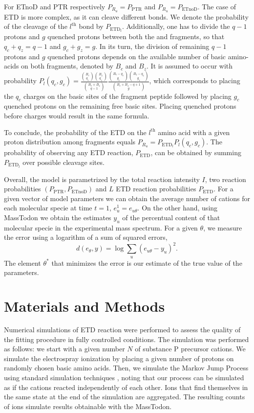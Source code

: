 \documentclass{llncs}
\begin{document}
For ETnoD and PTR respectively $P_{R_u}=P_\text{PTR}$ and $P_{R_u}=P_\text{ETnoD}$.
The case of ETD is more complex, as it can cleave different bonds. We denote the probability of the cleavage of the $l^\text{th}$ bond by $P_{\text{ETD}_l}$. Additionally, one has to divide the $q-1$ protons and $g$ quenched protons between both the  and  fragments, so that $q_c+q_z=q-1$ and $g_c+g_z = g$. In its turn, the division of remaining $q-1$ protons and $g$ quenched protons depends on the available number of basic amino-acids on both fragments, denoted by $B_c$ and $B_z$. It is assumed to occur with probability $P_l(q_c, g_c) = \frac{ \binom{B_c}{q_c}\binom{B_z}{q_z} }{ \binom{B_c+B_z}{q-1} } \frac{ \binom{B_c - q_c}{g_c} \binom{B_z-q_z}{g_z} }{ \binom{B_c+B_z-q+1}{g} }$,
which corresponds to placing the $q_c$ charges on the basic sites of the fragment peptide followed by placing $g_c$ quenched protons on the remaining free basic sites. Placing quenched protons before charges would result in the same formula.

To conclude, the probability of the ETD on the $l^\text{th}$ amino acid with a given proton distribution among fragments equals $P_{R_u}=P_{\text{ETD}_l} P_l(q_c, g_c)$. The probability of observing any ETD reaction, $P_\text{ETD}$, can be obtained by summing $P_{\text{ETD}_l}$ over possible cleavage sites.

Overall, the model is parametrized by the total reaction intensity $I$, two reaction probabilities $(P_\text{PTR}, P_\text{ETnoD})$ and $L$ ETD reaction probabilities $P_\text{ETD}$. For a given vector of model parameters  we can obtain the average number of cations for each molecular specie at time $t=1$, $e_u^1 =e_{u\theta}$. On the other hand, using {\sc MassTodon} we obtain the estimates $y_u$ of the percentual content of that molecular specie in the experimental mass spectrum. For a given $\theta$, we measure the error using a logarithm of a sum of squared errors, $$d(e_\theta,y) = \log \sum_u (e_{u\theta}-y_u)^2.$$
The element $\theta^*$ that minimizes the error is our estimate of the true value of the parameters.


\section{Materials and Methods}

Numerical simulations of ETD reaction were performed to assess the quality of the fitting procedure in fully controlled conditions. The simulation was performed as follows: we start with a given number $N$ of substance P precursor cations. We simulate the electrospray ionization by placing a given number of protons on randomly chosen basic amino acids. Then, we simulate the Markov Jump Process using standard simulation techniques \cite{Gillespie1977-fr}, noting that our process can be simulated as if the cations reacted independently of each other. Ions that find themselves in the same state at the end of the simulation are aggregated. The resulting counts of ions simulate results obtainable with the {\sc MassTodon}.
\end{document}
